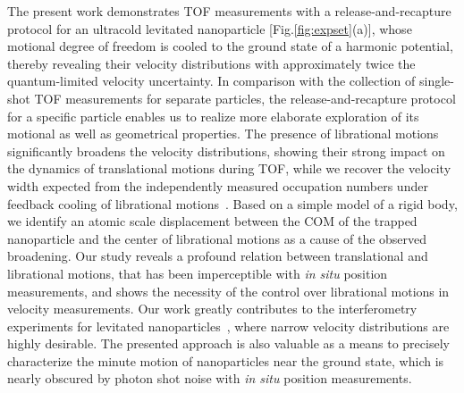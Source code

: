 \documentclass[aps, prl, 
amsmath, showpacs, preprintnumbers, twocolumn, amssymb, amsmath, superscriptaddress]{revtex4-1}
\begin{document}
The present work demonstrates TOF measurements with a release-and-recapture protocol for an ultracold levitated nanoparticle [Fig.\ref{fig:expset}(a)], whose motional degree of freedom is cooled to the ground state of a harmonic potential, thereby revealing their velocity distributions with approximately twice the quantum-limited velocity uncertainty. In comparison with the collection of single-shot TOF measurements for separate particles, the release-and-recapture protocol for a specific particle enables us to realize more elaborate exploration of its motional as well as geometrical properties. The presence of librational motions significantly broadens the velocity distributions, showing their strong impact on the dynamics of translational motions during TOF, while we recover the velocity width expected from the independently measured occupation numbers under feedback cooling of librational motions~\cite{pontin2023simultaneous,kamba2023nanoscale}. Based on a simple model of a rigid body, we identify an atomic scale displacement between the COM of the trapped nanoparticle and the center of librational motions as a cause of the observed broadening. Our study reveals a profound relation between translational and librational motions, that has been imperceptible with {\it in situ} position measurements, and shows the necessity of the control over librational motions in velocity measurements. Our work greatly contributes to the interferometry experiments for levitated nanoparticles~\cite{romero-isart2011large,bateman2014near}, where narrow velocity distributions are highly desirable. The presented approach is also valuable as a means to precisely characterize the minute motion of nanoparticles near the ground state, which is nearly obscured by photon shot noise with {\it in situ} position measurements. 
\end{document}
